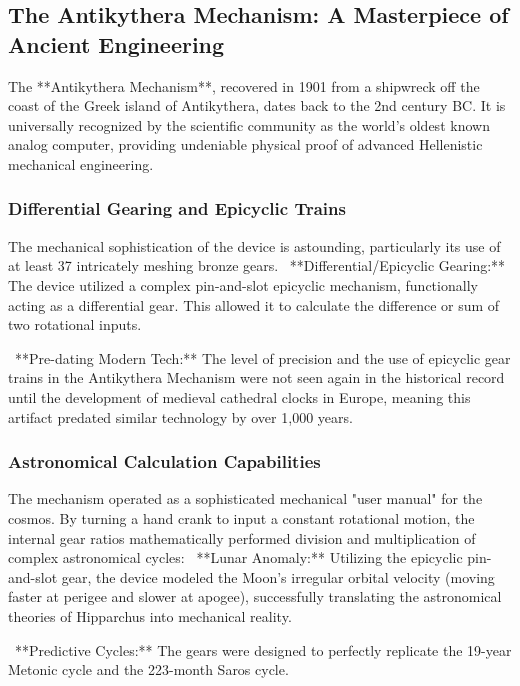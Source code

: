 \documentclass[aps,prd,11pt,onecolumn,superscriptaddress,nofootinbib,floatfix]{revtex4-2}
\begin{document}
\subsection{The Antikythera Mechanism: A Masterpiece of Ancient Engineering}


The **Antikythera Mechanism**, recovered in 1901 from a shipwreck off the coast of the Greek island of Antikythera, dates back to the 2nd century BC. It is universally recognized by the scientific community as the world's oldest known analog computer, providing undeniable physical proof of advanced Hellenistic mechanical engineering.


\subsubsection{Differential Gearing and Epicyclic Trains}
The mechanical sophistication of the device is astounding, particularly its use of at least 37 intricately meshing bronze gears.
\textbullet~**Differential/Epicyclic Gearing:** The device utilized a complex pin-and-slot epicyclic mechanism, functionally acting as a differential gear. This allowed it to calculate the difference or sum of two rotational inputs.

\textbullet~**Pre-dating Modern Tech:** The level of precision and the use of epicyclic gear trains in the Antikythera Mechanism were not seen again in the historical record until the development of medieval cathedral clocks in Europe, meaning this artifact predated similar technology by over 1,000 years.



\subsubsection{Astronomical Calculation Capabilities}
The mechanism operated as a sophisticated mechanical "user manual" for the cosmos. By turning a hand crank to input a constant rotational motion, the internal gear ratios mathematically performed division and multiplication of complex astronomical cycles:
\textbullet~**Lunar Anomaly:** Utilizing the epicyclic pin-and-slot gear, the device modeled the Moon's irregular orbital velocity (moving faster at perigee and slower at apogee), successfully translating the astronomical theories of Hipparchus into mechanical reality.

\textbullet~**Predictive Cycles:** The gears were designed to perfectly replicate the 19-year Metonic cycle and the 223-month Saros cycle.
\end{document}
